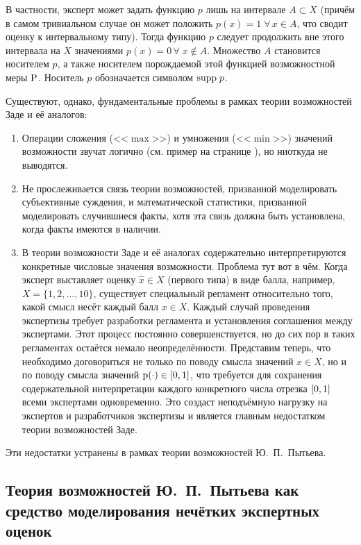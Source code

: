В частности, эксперт может задать функцию $p$ лишь на интервале $A \subset X$ (причём в самом тривиальном случае он может положить $p(x) = 1\; \forall\, x \in A$, что сводит оценку к интервальному типу). Тогда функцию $p$ следует продолжить вне этого интервала на $X$ значениями $p(x) = 0\, \forall\; x \notin A$. Множество $A$ становится носителем $p$, а также носителем порождаемой этой функцией возможностной меры $\P$. Носитель $p$ обозначается символом $\supp\; p$.

Существуют, однако, фундаментальные проблемы в рамках теории возможностей Заде и её аналогов:
\begin{enumerate}
\item
Операции сложения (<<$\max$>>) и умножения (<<$\min$>>) значений возможности звучат логично (см. пример на странице \pageref{example_zadeh}), но ниоткуда не выводятся.
\item
Не прослеживается связь теории возможностей, призванной моделировать субъективные суждения, и математической статистики, призванной моделировать случившиеся факты, хотя эта связь должна быть установлена, когда факты имеются в наличии.
\item
В теории возможности Заде и её аналогах содержательно интерпретируются конкретные числовые значения возможности. Проблема тут вот в чём.
Когда эксперт выставляет оценку $\hat{x}  \in X$ (первого типа) в виде балла, например, $X = \{1, 2, ..., 10\}$, существует специальный регламент относительно того, какой смысл несёт каждый балл $x \in X$. Каждый случай проведения экспертизы требует разработки регламента и установления соглашения между экспертами. Этот процесс постоянно совершенствуется, но до сих пор в таких регламентах остаётся немало неопределённости. Представим теперь, что необходимо договориться не только по поводу смысла значений $x \in X$, но и по поводу смысла значений $\p(\cdot) \in \zo$, что требуется для сохранения содержательной интерпретации каждого конкретного числа отрезка $\zo$ всеми экспертами одновременно. Это создаст неподъёмную нагрузку на экспертов и разработчиков экспертизы и является главным недостатком теории возможностей Заде. 
\end{enumerate}
Эти недостатки устранены в рамках теории возможностей Ю.~П.~Пытьева.

\subsection{Теория возможностей Ю.~П.~Пытьева как средство моделирования нечётких экспертных оценок}
\label{sec:math_methods_ours}

